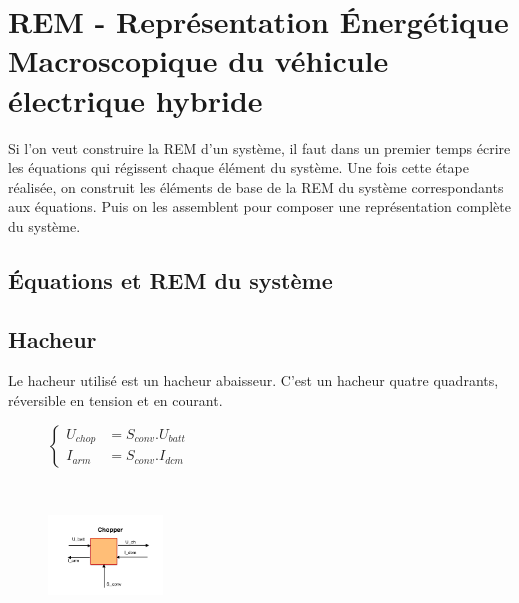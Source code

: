 \section{REM - Représentation \'Energétique Macroscopique du véhicule électrique hybride}

Si l'on veut construire la REM d'un système, il faut dans un premier temps écrire les équations qui régissent chaque élément du système. Une fois cette étape réalisée, on construit les éléments de base de la REM du système correspondants aux équations. Puis on les assemblent pour composer une représentation complète du système.

\subsection{Équations et REM du système}

\subsection{Hacheur}
Le hacheur utilisé est un hacheur abaisseur. C'est un hacheur quatre quadrants, réversible en tension et en courant.  
\vspace{-10px}
\begin{figure}[ht]
\centering
\begin{minipage}{.5\textwidth}  
\centering
$\begin{cases}
	 U_{chop} &= S_{conv}.U_{batt}\\
	I_{arm} &= S_{conv}.I_{dcm}
\end{cases}$
\end{minipage}~
\begin{minipage}{.5\textwidth}
  \centering
\includegraphics[height=80px]{images/Chopper.png}
\end{minipage}
\end{figure}
\FloatBarrier
\vspace{-20px}

